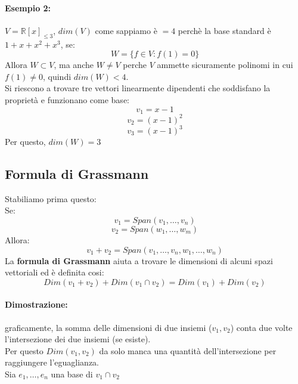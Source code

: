 \documentclass[12pt,a4paper]{article}
\begin{document}
\paragraph{Esempio 2:} $V = \mathbb{R}[x]_{\leq 3}$, $dim(V)$ come sappiamo è $=4$ perchè la base standard è $1 + x + x^2 + x^3$, se:
\[
W = \{f \in V : f(1) = 0\}
\]
Allora $W \subset V$, ma anche $W \ne V$ perche $V$ ammette sicuramente polinomi in cui $f(1) \ne 0$, quindi $dim(W) < 4$.\\
Si riescono a trovare tre vettori linearmente dipendenti che soddisfano la proprietà e funzionano come base:
\[
v_1 = x-1
\]
\[
v_2 = (x-1)^2
\]
\[
v_3 = (x-1)^3
\]
Per questo, $dim(W) = 3$
\subsection{Formula di Grassmann}
Stabiliamo prima questo:\\
Se:
\[
v_1 = Span(v_1,\ldots,v_n)
\]
\[
v_2 = Span(w_1,\ldots,w_m)
\]
Allora:
\[
v_1 + v_2 = Span(v_1,\ldots,v_n,w_1,\ldots,w_n)
\]
La \textbf{formula di Grassmann} aiuta a trovare le dimensioni di alcuni spazi vettoriali ed è definita cosi:
\[
Dim(v_1 + v_2) + Dim(v_1 \cap v_2) = Dim(v_1) + Dim(v_2)
\]
\paragraph{Dimostrazione:} graficamente, la somma delle dimensioni di due insiemi ($v_1,v_2$) conta due volte l'intersezione dei due insiemi (se esiste).\\
Per questo $Dim(v_1,v_2)$ da solo manca una quantità dell'intersezione per raggiungere l'eguaglianza.\\
Sia $e_1,\ldots,e_n$ una base di $v_1 \cap v_2$\\
\end{document}
